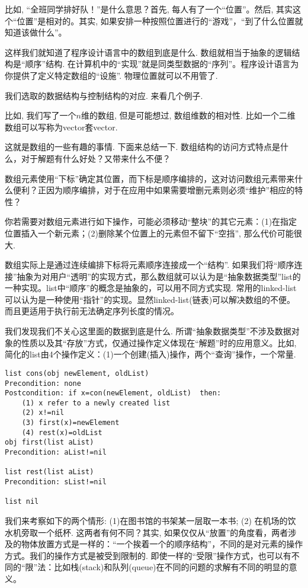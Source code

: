 比如, “全班同学排好队！”是什么意思？首先, 每人有了一个“位置”。然后, 其实这个“位置”是相对的。其实, 如果安排一种按照位置进行的“游戏”，“到了什么位置就知道该做什么”。

这样我们就知道了程序设计语言中的数组到底是什么. 数组就相当于抽象的逻辑结构是“顺序”结构. 在计算机中的“实现”就是同类型数据的“序列”。程序设计语言为你提供了定义特定数组的“设施”. 物理位置就可以不用管了. 

我们选取的数据结构与控制结构的对应. 来看几个例子. 


比如, 我们写了一个$n$维的数组, 但是可能想过, 数组维数的相对性. 比如一个二维数组可以写称为vector套vector. 

这就是数组的一些有趣的事情. 下面来总结一下. 数组结构的访问方式特点是什么，对于解题有什么好处？又带来什么不便？

数组元素使用“下标”确定其位置，而下标是顺序编排的，这对访问数组元素带来什么便利？正因为顺序编排，对于在应用中如果需要增删元素则必须“维护”相应的特性？

你若需要对数组元素进行如下操作，可能必须移动“整块”的其它元素：(1)在指定位置插入一个新元素；(2)删除某个位置上的元素但不留下“空挡”, 那么代价可能很大. 

数组实际上是通过连续编排下标将元素顺序连接成一个“结构”. 如果我们将“顺序连接”抽象为对用户“透明”的实现方式，那么数组就可以认为是“抽象数据类型”list的一种实现。list中“顺序”的概念是抽象的，可以用不同方式实现. 常用的linked-list可以认为是一种使用“指针”的实现。显然linked-list(链表)可以解决数组的不便。而且更适用于执行前无法确定序列长度的情况。

我们发现我们不关心这里面的数据到底是什么. 所谓“抽象数据类型”不涉及数据对象的性质以及其“存放”方式，仅通过操作定义体现在“解题”时的应用意义。比如, 简化的list由4个操作定义：(1)一个创建(插入)操作，两个“查询”操作，一个常量.

\begin{lstlisting}
list cons(obj newElement, oldList)
Precondition: none
Postcondition: if x=con(newElement, oldList)  then:
    (1) x refer to a newly created list
    (2) x!=nil
    (3) first(x)=newElement
    (4) rest(x)=oldList
obj first(list aList)
Precondition: aList!=nil

list rest(list aList)
Precondition: sList!=nil

list nil
\end{lstlisting}



我们来考察如下的两个情形: (1)在图书馆的书架某一层取一本书; (2) 在机场的饮水机旁取一个纸杯. 这两者有何不同？其实, 如果仅仅从“放置”的角度看，两者涉及的物体放置方式是一样的：“一个挨着一个的顺序结构”，不同的是对元素的操作方式。我们的操作方式是被受到限制的. 即使一样的“受限”操作方式，也可以有不同的“限”法：比如栈(stack)和队列(queue)在不同的问题的求解有不同的明显的意义。



